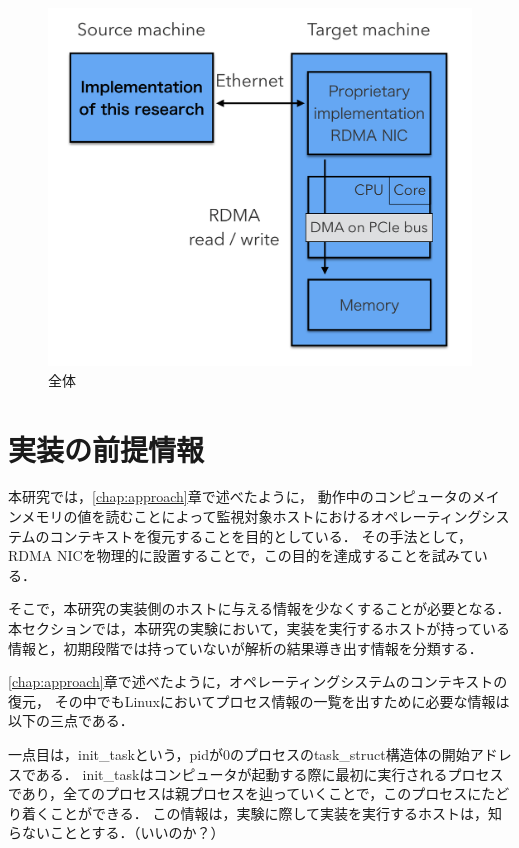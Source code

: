\begin{figure}[htbp]
    \caption{全体}
    \label{fig:zentai}
    \begin{center}
        \includegraphics[bb=0 0 1000 800,width=15cm]{img/zentai.png}
    \end{center}
\end{figure}

\section{実装の前提情報}

本研究では，\ref{chap:approach}章で述べたように，
動作中のコンピュータのメインメモリの値を読むことによって監視対象ホストにおけるオペレーティングシステムのコンテキストを復元することを目的としている．
その手法として，RDMA NICを物理的に設置することで，この目的を達成することを試みている．

そこで，本研究の実装側のホストに与える情報を少なくすることが必要となる．
本セクションでは，本研究の実験において，実装を実行するホストが持っている情報と，初期段階では持っていないが解析の結果導き出す情報を分類する．

\ref{chap:approach}章で述べたように，オペレーティングシステムのコンテキストの復元，
その中でもLinuxにおいてプロセス情報の一覧を出すために必要な情報は以下の三点である．

一点目は，init_taskという，pidが0のプロセスのtask_struct構造体の開始アドレスである．
init_taskはコンピュータが起動する際に最初に実行されるプロセスであり，全てのプロセスは親プロセスを辿っていくことで，このプロセスにたどり着くことができる．
この情報は，実験に際して実装を実行するホストは，知らないこととする．（いいのか？）

